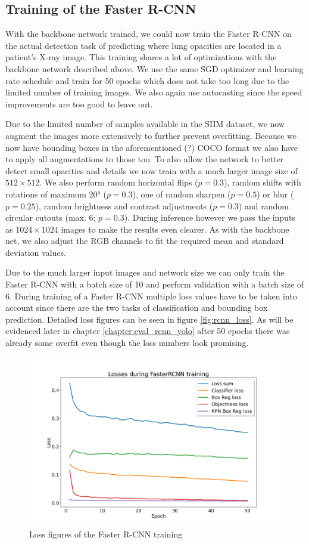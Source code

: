 \subsection*{Training of the Faster R-CNN}

With the backbone network trained, we could now train the Faster R-CNN on the actual detection task of predicting where lung opacities are located in a patient's X-ray image. This training shares a lot of optimizations with the backbone network described above. We use the same \ac{SGD} optimizer and learning rate schedule and train for 50 epochs which does not take too long due to the limited number of training images. We also again use autocasting since the speed improvements are too good to leave out.

Due to the limited number of samples available in the SIIM dataset, we now augment the images more extensively to further prevent overfitting. Because we now have bounding boxes in the aforementioned (?) COCO format we also have to apply all augmentations to those too. To also allow the network to better detect small opacities and details we now train with a much larger image size of $512 \times 512$. We also perform random horizontal flips ($p=0.3$), random shifts with rotations of maximum 20° ($p=0.3$), one of random sharpen ($p=0.5$) or blur ($p=0.25$), random brightness and contrast adjustments ($p=0.3$) and random circular cutouts (max. 6; $p=0.3$). During inference however we pass the inputs as $1024 \times 1024$ images to make the results even clearer. As with the backbone net, we also adjust the RGB channels to fit the required mean and standard deviation values.

Due to the much larger input images and network size we can only train the Faster R-CNN with a batch size of 10 and perform validation with a batch size of 6. During training of a Faster R-CNN multiple loss values have to be taken into account since there are the two tasks of classification and bounding box prediction. Detailed loss figures can be seen in figure \vref{fig:rcnn_loss}. As will be evidenced later in chapter \vref{chapter:eval_rcnn_yolo} after 50 epochs there was already some overfit even though the loss numbers look promising.

\begin{figure}
	\centering
	\includegraphics[width=.7\linewidth]{img/loss_fasterrcnn_50.png}
	\caption{Loss figures of the Faster R-CNN training}
	\label{fig:rcnn_loss}
\end{figure}

